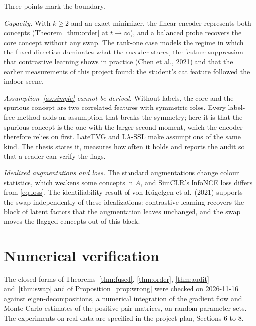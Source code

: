\documentclass[11pt]{article}
\theoremstyle{definition}
\theoremstyle{remark}
\begin{document}
Three points mark the boundary.

\emph{Capacity.} With $k\ge2$ and an exact minimizer, the linear encoder represents both concepts
(Theorem~\ref{thm:order} at $t\to\infty$), and a balanced probe recovers the core concept without any swap. The
rank-one case models the regime in which the fused direction dominates what the encoder stores, the feature
suppression that contrastive learning shows in practice (Chen et al., 2021) and that the earlier measurements of this
project found: the student's cat feature followed the indoor scene.

\emph{Assumption~\ref{as:simple} cannot be derived.} Without labels, the core and the spurious concept are two
correlated features with symmetric roles. Every label-free method adds an assumption that breaks the symmetry; here it
is that the spurious concept is the one with the larger second moment, which the encoder therefore relies on first.
LateTVG and LA-SSL make assumptions of the same kind. The thesis states it, measures how often it holds and reports
the audit so that a reader can verify the flags.

\emph{Idealized augmentations and loss.} The standard augmentations change colour statistics, which weakens some
concepts in $A$, and SimCLR's InfoNCE loss differs from \eqref{eq:loss}. The identifiability result of von K\"ugelgen
et al.\ (2021) supports the swap independently of these idealizations: contrastive learning recovers the block of
latent factors that the augmentation leaves unchanged, and the swap moves the flagged concepts out of this block.

\section{Numerical verification}\label{sec:kill}

The closed forms of Theorems~\ref{thm:fused}, \ref{thm:order}, \ref{thm:audit} and~\ref{thm:swap} and of
Proposition~\ref{prop:wrong} were checked on 2026-11-16 against eigen-decompositions, a numerical integration of the
gradient flow and Monte Carlo estimates of the positive-pair matrices, on random parameter sets. The experiments on
real data are specified in the project plan, Sections 6 to 8.
\end{document}
